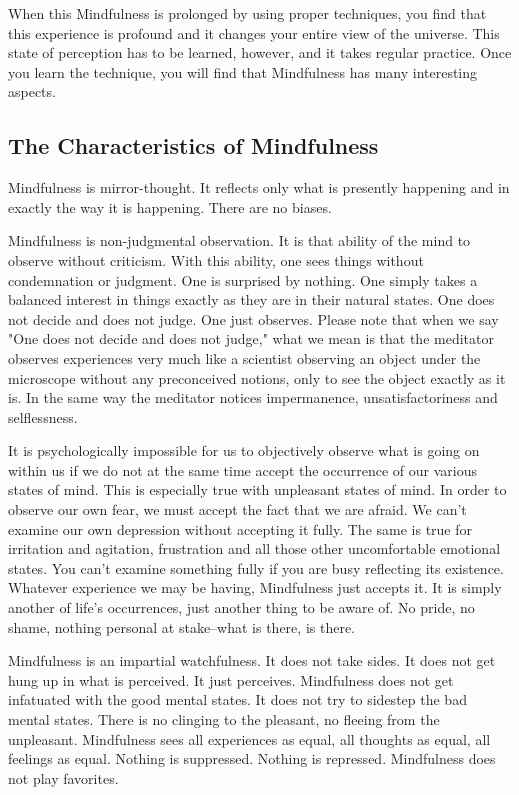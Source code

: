 When this Mindfulness is prolonged by using proper techniques, you find that
this experience is profound and it changes your entire view of the universe.
This state of perception has to be learned, however, and it takes regular
practice. Once you learn the technique, you will find that Mindfulness has many
interesting aspects.

\subsection*{The Characteristics of Mindfulness} 
Mindfulness is mirror-thought. It reflects only what is presently happening and
in exactly the way it is happening. There are no biases.

Mindfulness is non-judgmental observation. It is that ability of the mind to
observe without criticism. With this ability, one sees things without
condemnation or judgment. One is surprised by nothing. One simply takes a
balanced interest in things exactly as they are in their natural states. One
does not decide and does not judge. One just observes. Please note that when we
say "One does not decide and does not judge," what we mean is that the meditator
observes experiences very much like a scientist observing an object under the
microscope without any preconceived notions, only to see the object exactly as
it is. In the same way the meditator notices impermanence, unsatisfactoriness
and selflessness.

It is psychologically impossible for us to objectively observe what is going on
within us if we do not at the same time accept the occurrence of our various
states of mind. This is especially true with unpleasant states of mind. In order
to observe our own fear, we must accept the fact that we are afraid. We can't
examine our own depression without accepting it fully. The same is true for
irritation and agitation, frustration and all those other uncomfortable
emotional states. You can't examine something fully if you are busy reflecting
its existence. Whatever experience we may be having, Mindfulness just accepts
it. It is simply another of life's occurrences, just another thing to be aware
of. No pride, no shame, nothing personal at stake--what is there, is there.

Mindfulness is an impartial watchfulness. It does not take sides. It does not
get hung up in what is perceived. It just perceives.
Mindfulness does not get infatuated with the good mental states. It does not try to sidestep the bad mental states. There is no
clinging to the pleasant, no fleeing from the unpleasant. Mindfulness sees all experiences as equal, all thoughts as equal, all
feelings as equal. Nothing is suppressed. Nothing is repressed. Mindfulness does not play favorites.

